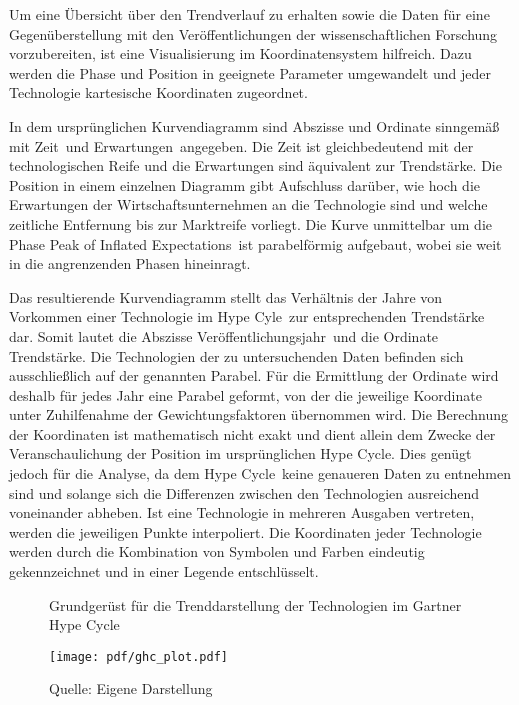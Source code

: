 Um eine Übersicht über den Trendverlauf zu erhalten sowie die Daten für eine Gegenüberstellung mit den Veröffentlichungen der wissenschaftlichen Forschung vorzubereiten, ist eine Visualisierung im Koordinatensystem hilfreich. Dazu werden die Phase und Position in geeignete Parameter umgewandelt und jeder Technologie kartesische Koordinaten zugeordnet.

In dem ursprünglichen Kurvendiagramm sind Abszisse und Ordinate sinngemäß mit \glqq Zeit\grqq~und \glqq Erwartungen\grqq~angegeben. Die Zeit ist gleichbedeutend mit der technologischen Reife und die Erwartungen sind äquivalent zur Trendstärke. Die Position in einem einzelnen Diagramm gibt Aufschluss darüber, wie hoch die Erwartungen der Wirtschaftsunternehmen an die Technologie sind und welche zeitliche Entfernung bis zur Marktreife vorliegt. Die Kurve unmittelbar um die Phase \glqq Peak of Inflated Expectations\grqq~ist parabelförmig aufgebaut, wobei sie weit in die angrenzenden Phasen hineinragt.

Das resultierende Kurvendiagramm stellt das Verhältnis der Jahre von Vorkommen einer Technologie im \glqq Hype Cyle\grqq~zur entsprechenden Trendstärke dar. Somit lautet die Abszisse \glqq Veröffentlichungsjahr\grqq~und die Ordinate \glqq Trendstärke\grqq. Die Technologien der zu untersuchenden Daten befinden sich ausschließlich auf der genannten Parabel. Für die Ermittlung der Ordinate wird deshalb für jedes Jahr eine Parabel geformt, von der die jeweilige Koordinate unter Zuhilfenahme der Gewichtungsfaktoren übernommen wird. Die Berechnung der Koordinaten ist mathematisch nicht exakt und dient allein dem Zwecke der Veranschaulichung der Position im ursprünglichen \glqq Hype Cycle\grqq. Dies genügt jedoch für die Analyse, da dem \glqq Hype Cycle\grqq~keine genaueren Daten zu entnehmen sind und solange sich die Differenzen zwischen den Technologien ausreichend voneinander abheben. Ist eine Technologie in mehreren Ausgaben vertreten, werden die jeweiligen Punkte interpoliert. Die Koordinaten jeder Technologie werden durch die Kombination von Symbolen und Farben eindeutig gekennzeichnet und in einer Legende entschlüsselt.

\begin{figure}
	\centering
	\caption{Grundgerüst für die Trenddarstellung der Technologien im \glqq Gartner Hype Cycle\grqq}
	\texttt{[image: pdf/ghc\_plot.pdf]}
	\caption*{Quelle: Eigene Darstellung}
	\label{fig:ghc_plot}
\end{figure}


